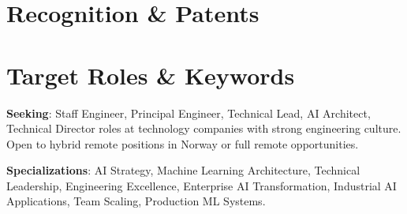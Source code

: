 \documentclass[singlesided,
               paper=a4,
               fontsize=10pt
              ]{my-resume}
\begin{document}
\section[\faTrophy]{Recognition \& Patents}

\section[\faGears]{Target Roles \& Keywords}
\textbf{Seeking}: Staff Engineer, Principal Engineer, Technical Lead, AI Architect, Technical Director roles at technology companies with strong engineering culture. Open to hybrid remote positions in Norway or full remote opportunities.

\textbf{Specializations}: AI Strategy, Machine Learning Architecture, Technical Leadership, Engineering Excellence, Enterprise AI Transformation, Industrial AI Applications, Team Scaling, Production ML Systems.
\end{document}
